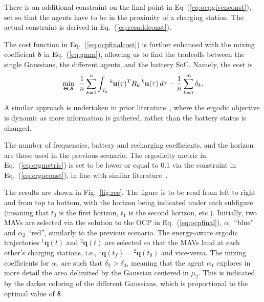 \documentclass[letterpaper,10pt,conference,twoside]{IEEEtran}
\theoremstyle{definition}
\begin{document}
There is an additional constraint on the final point in Eq~(\ref{eq:ocpgivenconst}), set so that the agents have to be in the proximity of a charging station. The actual constraint is derived in Eq.~(\ref{eq:resaddconst}). %

The cost function in Eq.~(\ref{eq:ocpfinalcost}) is further enhanced with the mixing coefficient $\boldsymbol{\delta}$ in Eq.~(\ref{eq:gmm}), allowing us to find the tradeoffs between the single Gaussians, the different agents, and the battery SoC. Namely, the cost is
\begin{equation}
  \min_{\boldsymbol{\Theta},\boldsymbol{\delta}}\,\,\,{\frac{1}{n}\sum_{k=1}^{n}\int_{\mathcal{T}_k}{}^k\hspace*{-.1ex}\mathbf{u}(\tau)^TR_k\,{}^k\hspace*{-.1ex}\mathbf{u}(\tau)\,d\tau-\frac{1}{n}\sum_{k=1}^{m}\delta_k}.
\end{equation}

A similar approach is undertaken in prior literature~\cite{rao2023multi}, where the ergodic objective is dynamic as more information is gathered, rather than the battery status is changed.

The number of frequencies, battery and recharging coefficients, and the horizon are those used in the previous scenario.
The ergodicity metric in Eq.~(\ref{eq:ergmetric}) is set to be lower or equal to 0.1 via the constraint in Eq.~(\ref{eq:ergoconst}), in line with similar literature~\cite{dong2023time}.

The results are shown in Fig.~\ref{fig:res}. The figure is to be read from left to right and from top to bottom, with the horizon being indicated under each subfigure (meaning that $t_0$ is the first horizon, $t_1$ is the second horizon, etc.). Initially, two MAVs are selected via the solution to the OCP in Eq.~(\ref{eq:ocpfinal}), $\alpha_1$ ``blue'' and $\alpha_2$ ``red'', similarly to the previous scenario. %
The energy-aware ergodic trajectories ${}^1\mathbf{q}(t)$ and ${}^2\mathbf{q}(t)$ are selected so that the MAVs land at each other's charging stations, i.e., ${}^1\mathbf{q}(t_f)={}^2\mathbf{q}(t_0)$ and vice-versa. The mixing coefficients for $\alpha_1$ are such that $\delta_2>\delta_3$, meaning that the agent $\alpha_1$ explores in more detail the area delimited by the Gaussian centered in $\mu_2$. This is indicated by the darker coloring of the different Gaussians, which is proportional to the optimal value of $\boldsymbol{\delta}$. 
\end{document}
